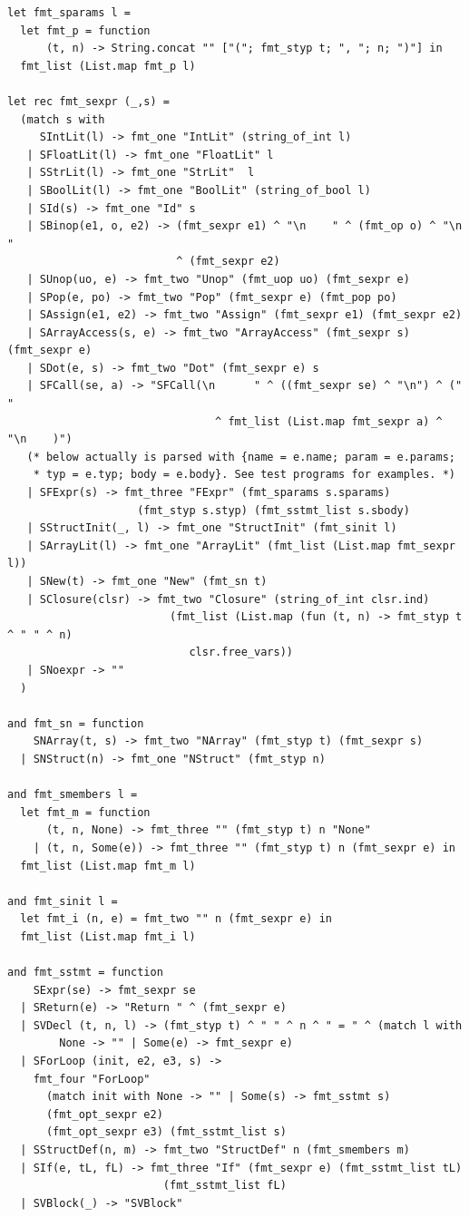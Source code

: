 \documentclass[12pt]{article}
\begin{document}
\begin{mdframed}[hidealllines=true,backgroundcolor=blue!20]
\begin{lstlisting}
let fmt_sparams l =
  let fmt_p = function
      (t, n) -> String.concat "" ["("; fmt_styp t; ", "; n; ")"] in
  fmt_list (List.map fmt_p l)

let rec fmt_sexpr (_,s) =
  (match s with
     SIntLit(l) -> fmt_one "IntLit" (string_of_int l)
   | SFloatLit(l) -> fmt_one "FloatLit" l
   | SStrLit(l) -> fmt_one "StrLit"  l
   | SBoolLit(l) -> fmt_one "BoolLit" (string_of_bool l)
   | SId(s) -> fmt_one "Id" s
   | SBinop(e1, o, e2) -> (fmt_sexpr e1) ^ "\n    " ^ (fmt_op o) ^ "\n    " 
                          ^ (fmt_sexpr e2)
   | SUnop(uo, e) -> fmt_two "Unop" (fmt_uop uo) (fmt_sexpr e)
   | SPop(e, po) -> fmt_two "Pop" (fmt_sexpr e) (fmt_pop po)
   | SAssign(e1, e2) -> fmt_two "Assign" (fmt_sexpr e1) (fmt_sexpr e2)
   | SArrayAccess(s, e) -> fmt_two "ArrayAccess" (fmt_sexpr s) (fmt_sexpr e)
   | SDot(e, s) -> fmt_two "Dot" (fmt_sexpr e) s
   | SFCall(se, a) -> "SFCall(\n      " ^ ((fmt_sexpr se) ^ "\n") ^ ("      " 
                                ^ fmt_list (List.map fmt_sexpr a) ^ "\n    )")
   (* below actually is parsed with {name = e.name; param = e.params;
    * typ = e.typ; body = e.body}. See test programs for examples. *)
   | SFExpr(s) -> fmt_three "FExpr" (fmt_sparams s.sparams)
                    (fmt_styp s.styp) (fmt_sstmt_list s.sbody)
   | SStructInit(_, l) -> fmt_one "StructInit" (fmt_sinit l)
   | SArrayLit(l) -> fmt_one "ArrayLit" (fmt_list (List.map fmt_sexpr l))
   | SNew(t) -> fmt_one "New" (fmt_sn t)
   | SClosure(clsr) -> fmt_two "Closure" (string_of_int clsr.ind) 
                         (fmt_list (List.map (fun (t, n) -> fmt_styp t ^ " " ^ n) 
                            clsr.free_vars))
   | SNoexpr -> ""
  )

and fmt_sn = function
    SNArray(t, s) -> fmt_two "NArray" (fmt_styp t) (fmt_sexpr s)
  | SNStruct(n) -> fmt_one "NStruct" (fmt_styp n)

and fmt_smembers l =
  let fmt_m = function
      (t, n, None) -> fmt_three "" (fmt_styp t) n "None"
    | (t, n, Some(e)) -> fmt_three "" (fmt_styp t) n (fmt_sexpr e) in
  fmt_list (List.map fmt_m l)

and fmt_sinit l =
  let fmt_i (n, e) = fmt_two "" n (fmt_sexpr e) in
  fmt_list (List.map fmt_i l)

and fmt_sstmt = function
    SExpr(se) -> fmt_sexpr se
  | SReturn(e) -> "Return " ^ (fmt_sexpr e)
  | SVDecl (t, n, l) -> (fmt_styp t) ^ " " ^ n ^ " = " ^ (match l with 
        None -> "" | Some(e) -> fmt_sexpr e)
  | SForLoop (init, e2, e3, s) -> 
    fmt_four "ForLoop" 
      (match init with None -> "" | Some(s) -> fmt_sstmt s)
      (fmt_opt_sexpr e2) 
      (fmt_opt_sexpr e3) (fmt_sstmt_list s)
  | SStructDef(n, m) -> fmt_two "StructDef" n (fmt_smembers m)
  | SIf(e, tL, fL) -> fmt_three "If" (fmt_sexpr e) (fmt_sstmt_list tL) 
                        (fmt_sstmt_list fL)
  | SVBlock(_) -> "SVBlock"


\end{lstlisting}
\end{mdframed}
\end{document}
